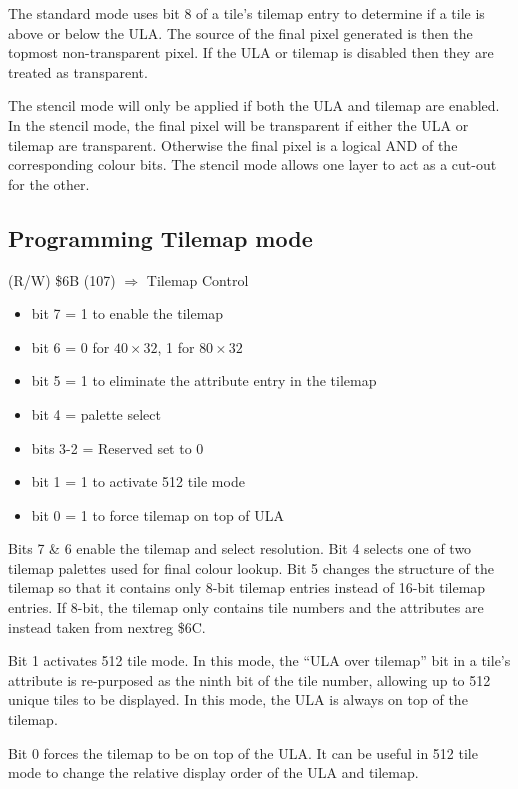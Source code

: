 The standard mode uses bit 8 of a tile's tilemap entry to determine if
a tile is above or below the ULA. The source of the final pixel
generated is then the topmost non-transparent pixel. If the ULA or
tilemap is disabled then they are treated as transparent.

The stencil mode will only be applied if both the ULA and tilemap are
enabled. In the stencil mode, the final pixel will be transparent if
either the ULA or tilemap are transparent. Otherwise the final pixel
is a logical AND of the corresponding colour bits. The stencil mode
allows one layer to act as a cut-out for the other.

\subsection{Programming Tilemap mode}

(R/W) \$6B (107) $\Rightarrow$ Tilemap Control
\begin{itemize}
\item[] bit 7    = 1 to enable the tilemap
\item[] bit 6    = 0 for $40\times32$, 1 for $80\times32$
\item[] bit 5    = 1 to eliminate the attribute entry in the tilemap
\item[] bit 4    = palette select
\item[] bits 3-2 = Reserved set to 0
\item[] bit 1    = 1 to activate 512 tile mode
\item[] bit 0    = 1 to force tilemap on top of ULA
\end{itemize}

Bits 7 \& 6 enable the tilemap and select resolution. Bit 4 selects one
of two tilemap palettes used for final colour lookup. Bit 5 changes
the structure of the tilemap so that it contains only 8-bit tilemap
entries instead of 16-bit tilemap entries. If 8-bit, the tilemap only
contains tile numbers and the attributes are instead taken from
nextreg \$6C.

Bit 1 activates 512 tile mode. In this mode, the “ULA over tilemap”
bit in a tile’s attribute is re-purposed as the ninth bit of the tile
number, allowing up to 512 unique tiles to be displayed. In this mode,
the ULA is always on top of the tilemap.

Bit 0 forces the tilemap to be on top of the ULA. It can be useful in
512 tile mode to change the relative display order of the ULA and
tilemap.

